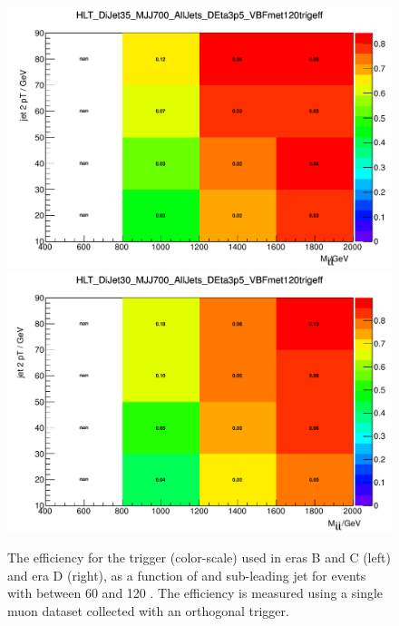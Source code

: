 \begin{figure} 
  \includegraphics[width=.6\largefigwidth]{plots/parked/HLT_DiJet35_MJJ700_AllJets_DEta3p5_VBFmet120trigeff.pdf}
  \includegraphics[width=.6\largefigwidth]{plots/parked/HLT_DiJet30_MJJ700_AllJets_DEta3p5_VBFmet120trigeff.pdf}
 \caption{The efficiency for the trigger (color-scale) used in eras B and C (left) and era D (right), as a function of \Mjj and sub-leading jet \pt for events with \METnoMU between 60 and 120 \GeV. The efficiency is measured using a single muon dataset collected with an orthogonal trigger.}
  \label{fig:parked3dtrigeff}
\end{figure}

